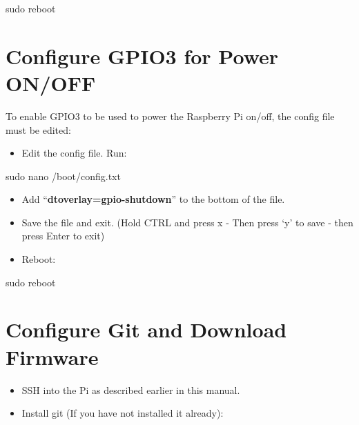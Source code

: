\documentclass[
  letterpaper,
]{scrbook}
\newenvironment{Shaded}{\begin{snugshade}}{\end{snugshade}}
\newcommand{\FunctionTok}[1]{\textcolor[rgb]{0.28,0.35,0.67}{#1}}
\newcommand{\NormalTok}[1]{\textcolor[rgb]{0.00,0.23,0.31}{#1}}
\providecommand{\tightlist}{%
  \setlength{\itemsep}{0pt}\setlength{\parskip}{0pt}}
\begin{document}
\begin{Shaded}
\begin{Highlighting}[]
\FunctionTok{sudo}\NormalTok{ reboot}
\end{Highlighting}
\end{Shaded}

\section{Configure GPIO3 for Power
ON/OFF}\label{configure-gpio3-for-power-onoff}

To enable GPIO3 to be used to power the Raspberry Pi on/off, the config
file must be edited:

\begin{itemize}
\tightlist
\item
  Edit the config file. Run:
\end{itemize}

\begin{Shaded}
\begin{Highlighting}[]
\FunctionTok{sudo}\NormalTok{ nano /boot/config.txt}
\end{Highlighting}
\end{Shaded}

\begin{itemize}
\item
  Add ``\textbf{dtoverlay=gpio-shutdown}'' to the bottom of the file.
\item
  Save the file and exit. (Hold CTRL and press x - Then press `y' to
  save - then press Enter to exit)
\item
  Reboot:
\end{itemize}

\begin{Shaded}
\begin{Highlighting}[]
\FunctionTok{sudo}\NormalTok{ reboot}
\end{Highlighting}
\end{Shaded}

\section{Configure Git and Download
Firmware}\label{configure-git-and-download-firmware}

\begin{itemize}
\item
  SSH into the Pi as described earlier in this manual.
\item
  Install git (If you have not installed it already):
\end{itemize}
\end{document}
